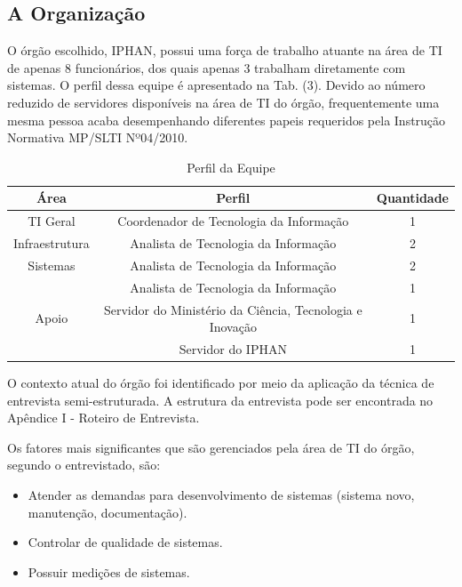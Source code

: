 \subsection[A Organização]{A Organização}

O órgão escolhido, IPHAN, possui uma força de trabalho atuante na área de TI de apenas 8 funcionários, dos quais apenas 3 trabalham diretamente com sistemas. O perfil dessa equipe é apresentado na Tab. (3). Devido ao número reduzido de servidores disponíveis na área de TI do órgão, frequentemente uma mesma pessoa acaba desempenhando diferentes papeis requeridos pela Instrução Normativa MP/SLTI Nº04/2010.

\begin{table}[H]
\center
\footnotesize
\begin{tabular}{|c|c|c|}
\hline
\textbf{Área}          & \textbf{Perfil}   & \textbf{Quantidade} \\ \hline
TI Geral               & Coordenador de Tecnologia da Informação   & 1                   \\ \hline
Infraestrutura         & Analista de Tecnologia da Informação   & 2                   \\ \hline
Sistemas               & Analista de Tecnologia da Informação   & 2                   \\ \hline
\multirow{3}{*}{Apoio} & Analista de Tecnologia da Informação    & 1                   \\ \cline{2-3} 
\multicolumn{1}{|l|}{} & Servidor do Ministério da Ciência, Tecnologia e Inovação & 1                   \\ \cline{2-3} 
\multicolumn{1}{|l|}{} & Servidor do IPHAN & 1                   \\ \hline
\end{tabular}
\caption{Perfil da Equipe}
\end{table}

O contexto atual do órgão foi identificado por meio da aplicação da técnica de entrevista semi-estruturada. A estrutura da entrevista pode ser encontrada no Apêndice I -  Roteiro de Entrevista.

Os fatores mais significantes que são gerenciados pela área de TI do órgão, segundo o entrevistado, são:
\begin{itemize}
\item Atender as demandas para desenvolvimento de sistemas (sistema novo, manutenção, documentação).
\item Controlar de qualidade de sistemas.
\item Possuir medições de sistemas.
\end{itemize}

